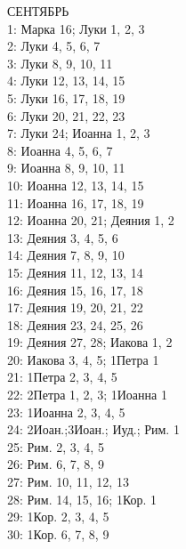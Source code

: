 \documentclass[fontsize=16pt,letterpaper,DIV=6]{scrartcl}
\begin{document}
\begin{multicols}{2}
СЕНТЯБРЬ
\\  1: Марка 16; Луки 1, 2, 3
\\  2: Луки 4, 5, 6, 7
\\  3: Луки 8, 9, 10, 11
\\  4: Луки 12, 13, 14, 15
\\  5: Луки 16, 17, 18, 19
\\  6: Луки 20, 21, 22, 23
\\  7: Луки 24; Иоанна 1, 2, 3
\\  8: Иоанна 4, 5, 6, 7
\\  9: Иоанна 8, 9, 10, 11
\\  10: Иоанна 12, 13, 14, 15
\\  11: Иоанна 16, 17, 18, 19
\\  12: Иоанна 20, 21; Деяния 1, 2
\\  13: Деяния 3, 4, 5, 6
\\  14: Деяния 7, 8, 9, 10
\\  15: Деяния 11, 12, 13, 14
\\  16: Деяния 15, 16, 17, 18
\\  17: Деяния 19, 20, 21, 22
\\  18: Деяния 23, 24, 25, 26
\\  19: Деяния 27, 28; Иакова 1, 2
\\  20: Иакова 3, 4, 5; 1Петра 1
\\  21: 1Петра 2, 3, 4, 5
\\  22: 2Петра 1, 2, 3; 1Иоанна 1
\\  23: 1Иоанна 2, 3, 4, 5
\\  24: 2Иоан.;3Иоан.; Иуд.; Рим. 1
\\  25: Рим. 2, 3, 4, 5
\\  26: Рим. 6, 7, 8, 9
\\  27: Рим. 10, 11, 12, 13
\\  28: Рим. 14, 15, 16; 1Кор. 1
\\  29: 1Кор. 2, 3, 4, 5
\\  30: 1Кор. 6, 7, 8, 9


\end{multicols}
\end{document}
